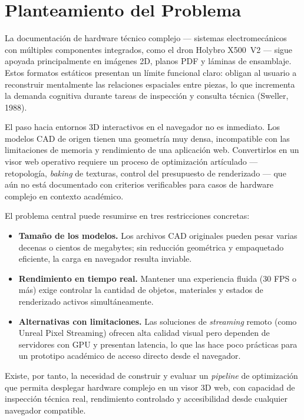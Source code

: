 \section{Planteamiento del Problema}

La documentaci\'on de hardware t\'ecnico complejo — sistemas electromec\'anicos con m\'ultiples componentes integrados, como el dron Holybro X500~V2 — sigue apoyada principalmente en im\'agenes 2D, planos PDF y l\'aminas de ensamblaje. Estos formatos est\'aticos presentan un l\'imite funcional claro: obligan al usuario a reconstruir mentalmente las relaciones espaciales entre piezas, lo que incrementa la demanda cognitiva durante tareas de inspecci\'on y consulta t\'ecnica (Sweller, 1988).

El paso hacia entornos 3D interactivos en el navegador no es inmediato. Los modelos CAD de origen tienen una geometr\'ia muy densa, incompatible con las limitaciones de memoria y rendimiento de una aplicaci\'on web. Convertirlos en un visor web operativo requiere un proceso de optimizaci\'on art\'iculado — retopolog\'ia, \textit{baking} de texturas, control del presupuesto de renderizado — que a\'un no est\'a documentado con criterios verificables para casos de hardware complejo en contexto acad\'emico.

El problema central puede resumirse en tres restricciones concretas:

\begin{itemize}
    \item \textbf{Tama\~no de los modelos.} Los archivos CAD originales pueden pesar varias decenas o cientos de megabytes; sin reducci\'on geom\'etrica y empaquetado eficiente, la carga en navegador resulta inviable.
    \item \textbf{Rendimiento en tiempo real.} Mantener una experiencia fluida (30 FPS o m\'as) exige controlar la cantidad de objetos, materiales y estados de renderizado activos simult\'aneamente.
    \item \textbf{Alternativas con limitaciones.} Las soluciones de \textit{streaming} remoto (como Unreal Pixel Streaming) ofrecen alta calidad visual pero dependen de servidores con GPU y presentan latencia, lo que las hace poco pr\'acticas para un prototipo acad\'emico de acceso directo desde el navegador.
\end{itemize}

Existe, por tanto, la necesidad de construir y evaluar un \textit{pipeline} de optimizaci\'on que permita desplegar hardware complejo en un visor 3D web, con capacidad de inspecci\'on t\'ecnica real, rendimiento controlado y accesibilidad desde cualquier navegador compatible.

